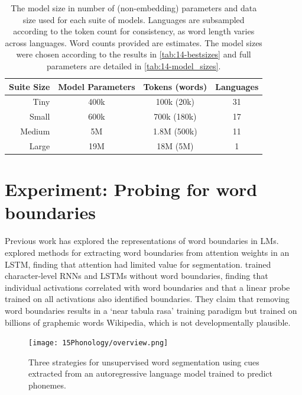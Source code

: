 \setlength{\tabcolsep}{2pt}
\begin{table}[t]
    \centering
    \small
    \begin{tabular}{rccc}
    \toprule
        Suite Size & Model Parameters & Tokens (words) & Languages \\
       \midrule
       Tiny & 400k & 100k (20k) & 31 \\
       Small & 600k & 700k (180k) & 17 \\
       Medium & 5M & 1.8M (500k) & 11 \\
       Large & 19M & 18M (5M) & 1 \\
       \bottomrule
    \end{tabular}
    \caption{The model size in number of (non-embedding) parameters and data size used for each suite of models. Languages are subsampled according to the token count for consistency, as word length varies across languages. Word counts provided are estimates. The model sizes were chosen according to the results in \cref{tab:14-bestsizes} and full parameters are detailed in \cref{tab:14-model_sizes}.}
    \label{tab:15-suites}
\end{table}

\section{Experiment: Probing for word boundaries}\label{sec:15-wordseg}

Previous work has explored the representations of word boundaries in LMs. \citet{sanabria2021difficulty} explored methods for extracting word boundaries from attention weights in an LSTM, finding that attention had limited value for segmentation. \citet{hahn-baroni-2019-tabula} trained character-level RNNs and LSTMs without word boundaries, finding that individual activations correlated with word boundaries and that a linear probe trained on all activations also identified boundaries. They claim that removing word boundaries results in a `near tabula rasa' training paradigm but trained on billions of graphemic words Wikipedia, which is not developmentally plausible.  %

\begin{figure}[t]
    \centering
    \texttt{[image: 15Phonology/overview.png]}
    \caption{Three strategies for unsupervised word segmentation using cues extracted from an autoregressive language model trained to predict phonemes.}
    \label{fig:15-example}
\end{figure}


